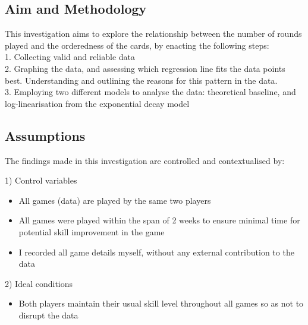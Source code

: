  
 \subsection{Aim and Methodology}
 
 This investigation aims to explore the relationship between the number of rounds played and the orderedness of the cards, by enacting the following steps:\\
 1. Collecting valid and reliable data \\
 2. Graphing the data, and assessing which regression line fits the data points best. Understanding and outlining the reasons for this pattern in the data.\\
 3. Employing two different models to analyse the data: theoretical baseline, and log-linearisation from the exponential decay model

 
 
 \subsection{Assumptions}
 
 The findings made in this investigation are controlled and contextualised by:
 
 1) Control variables
 \begin{itemize}
	\item All games (data) are played by the same two players
	\item All games were played within the span of 2 weeks to ensure minimal time for potential skill improvement in the game
	\item I recorded all game details myself, without any external contribution to the data
\end{itemize}

2) Ideal conditions
\begin{itemize}
	\item Both players maintain their usual skill level throughout all games so as not to disrupt the data
\end{itemize}

 
 
 
 
 
 
 
 
 
  
